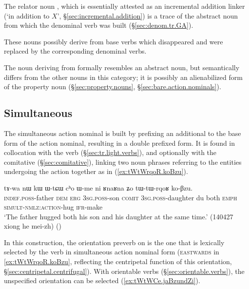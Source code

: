 The relator noun , which is essentially attested as an incremental addition linker (`in addition to $X$', §\ref{sec:incremental.addition}) is a trace of the abstract noun from which the denominal verb  was built (§\ref{sec:denom.tr.GA}).

These nouns possibly derive from base verbs which disappeared and were replaced by the corresponding denominal verbs.

The noun  deriving from  formally resembles an abstract noun, but semantically differs from the other nouns in this category; it is possibly an alienabilized form of the property noun  (§\ref{sec:property.nouns}, §\ref{sec:bare.action.nominals}).

  

\subsection{Simultaneous} \label{sec:simultaneous.action.nominal}
The simultaneous action nominal is built by prefixing an additional  to the base form of the action nominal, resulting in a double  prefixed form. It is found in collocation with the verb  (§\ref{sec:tr.light.verbs}), and optionally with the comitative  (§\ref{sec:comitative}), linking two noun phrases referring to the entities undergoing the action together as in (\ref{ex:tWtWrqoR.koBzu}).


\begin{exe}
	\ex \label{ex:tWtWrqoR.koBzu}
	\gll tɤ-wa nɯ kɯ ɯ-tɕɯ cʰo ɯ-me ni ʁnaʁna ʑo tɯ-tɯ-rqoʁ ko-βzu. \\
	\textsc{indef}.\textsc{poss}-father \textsc{dem} \textsc{erg} \textsc{3sg}.\textsc{poss}-son \textsc{comit} \textsc{3sg}.\textsc{poss}-daughter du both \textsc{emph} \textsc{simult}-\textsc{nmlz}:\textsc{action}-hug \textsc{ifr}-make \\
	\glt `The father hugged both his son and his daughter at the same time.' (140427 xiong he mei-zh)
()
 \end{exe}

In this construction, the orientation preverb on  is the one that is lexically selected by the verb in simultaneous action nominal form (\textsc{eastwards} in \ref{ex:tWtWrqoR.koBzu}, reflecting the centripetal function of this orientation, §\ref{sec:centripetal.centrifugal}). With orientable verbs (§\ref{sec:orientable.verbs}), the unspecified orientation   can be selected (\ref{ex:tWtWCe.jaBzundZi}). 
 
